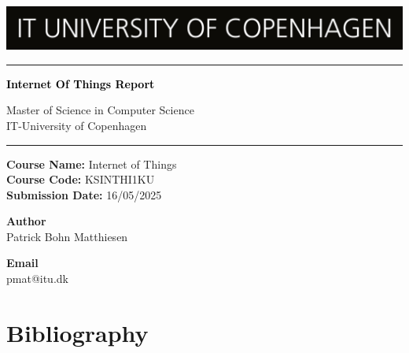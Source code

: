 \documentclass[a4paper,12pt]{article}
\begin{document}

\begin{titlepage}
    \centering
    \includegraphics[width=\textwidth]{pictures//ITU_logo_en.jpg}
        \textcolor{black}{\rule{\linewidth}{1pt}} \par
        {\Huge\bfseries \textcolor{black}{Internet Of Things Report}\par} 
        \vspace{1pt} {Master of Science in Computer Science \\ 
        IT-University of Copenhagen \par}
        \textcolor{black}{\rule{\linewidth}{1pt}} \par
        \vspace*{0.25cm}
    \textbf{Course Name:} Internet of Things\\
    \textbf{Course Code:} KSINTHI1KU\\
    \textbf{Submission Date:} 16/05/2025\\
    
    \vspace*{0.25cm}
    
    \begin{minipage}{0.70\textwidth}
        \begin{flushleft} \large
            \textbf{Author}\\
            Patrick Bohn Matthiesen 
        \end{flushleft}
        \end{minipage}
        \begin{minipage}{0.25\textwidth}
        \begin{flushright} \large
            \textbf{Email}\\
            pmat@itu.dk
        \end{flushright}
    \end{minipage}
\end{titlepage}

\tableofcontents %
\cleardoublepage{} %


\cleardoublepage{}


\cleardoublepage{}


\cleardoublepage{}


\section{Bibliography}
\printbibliography[heading=none]
\end{document}
